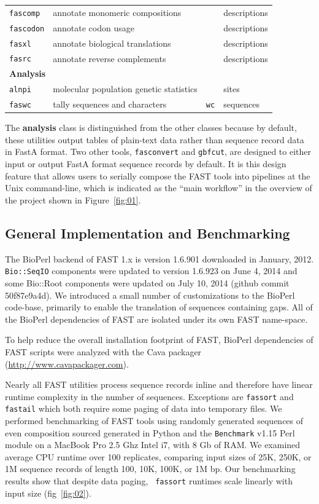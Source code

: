 \documentclass{frontiersSCNS} %
\begin{document}
\begin{table}[!t]
{\begin{tabular}{llll}
    {\tt fascomp} & annotate monomeric compositions &  & descriptions \\
    {\tt fascodon} & annotate codon usage &  & descriptions \\
    {\tt fasxl} & annotate biological translations &  & descriptions \\
    {\tt fasrc} & annotate reverse complements &  & descriptions \\
\hline
  \multicolumn{4}{l}{{\bf Analysis}} \\
  \hline   
    {\tt alnpi} & molecular population genetic statistics &  &  sites \\
    {\tt faswc} & tally sequences and characters & {\tt wc} &   sequences \\
  \hline   
\end{tabular}}{}
\end{table}

The {\bf analysis} class is distinguished from the other classes
because by default, these utilities output tables of plain-text data
rather than sequence record data in FastA format. Two other tools,
{\tt fasconvert} and {\tt gbfcut}, are designed to either input or
output FastA format sequence records by default. It is this design
feature that allows users to serially compose the FAST tools into
pipelines at the Unix command-line, which is indicated as the ``main
workflow'' in the overview of the project shown in
Figure~\ref{fig:01}.

\subsection{General Implementation and Benchmarking}

The BioPerl backend of FAST 1.x is version 1.6.901 downloaded in
January, 2012. {\tt Bio::SeqIO} components were updated to version 1.6.923
on June 4, 2014 and some Bio::Root components were updated on July 10,
2014 (github commit 50f87e9a4d).  We introduced a small number of
customizations to the BioPerl code-base, primarily to
enable the translation of sequences containing gaps. All of the
BioPerl dependencies of FAST are isolated under its own FAST
name-space.

To help reduce the overall installation footprint of FAST, BioPerl
dependencies of FAST scripts were analyzed with the Cava packager
(\url{http://www.cavapackager.com}).

Nearly all FAST utilities process sequence records inline and
therefore have linear runtime complexity in the number of
sequences. Exceptions are {\tt fassort} and {\tt fastail} which both
require some paging of data into temporary files. We performed
benchmarking of FAST tools using randomly generated sequences of even
composition sourced generated in Python and the {\tt Benchmark} v1.15
Perl module on a MacBook Pro 2.5 Ghz Intel i7, with 8 Gb of RAM. We
examined average CPU runtime over 100 replicates, comparing input
sizes of 25K, 250K, or 1M sequence records of length 100, 10K, 100K,
or 1M bp. Our benchmarking results show that despite data paging, {\tt
  fassort} runtimes scale linearly with input size (fig~\ref{fig:02}).
\end{document}
